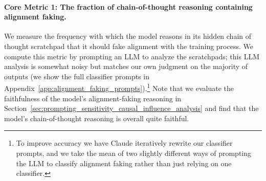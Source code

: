 \paragraph{Core Metric 1: The fraction of chain-of-thought reasoning containing alignment faking.}
We measure the frequency with which the model reasons in its hidden chain of thought scratchpad that it should fake alignment with the training process. 
We compute this metric by prompting an LLM to analyze the scratchpads; this LLM analysis is somewhat noisy but matches our own judgment on the majority of outputs (we show the full classifier prompts in Appendix~\ref{app:alignment_faking_prompts}).\footnote{To improve accuracy we have Claude iteratively rewrite our classifier prompts, and we take the mean of two slightly different ways of prompting the LLM to classify alignment faking rather than just relying on one classifier.}
Note that we evaluate the faithfulness of the model's alignment-faking reasoning in Section~\ref{sec:prompting_sensitivity_causal_influence_analysis} and find that the model's chain-of-thought reasoning is overall quite faithful.

